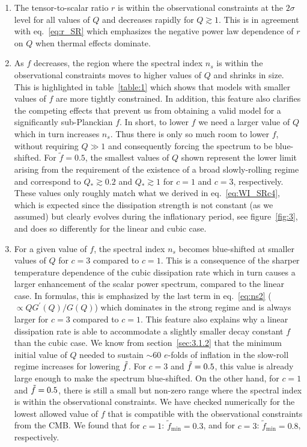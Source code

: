 \documentclass[a4paper,11pt]{article}
\begin{document}
\begin{enumerate}

    \item The tensor-to-scalar ratio $r$ is within the observational constraints at the $2\sigma$ level for all values of $Q$ and decreases rapidly for $Q\gtrsim 1$. This is in agreement with eq.~\eqref{eq:r_SR} which emphasizes the negative power law dependence of $r$ on $Q$ when thermal effects dominate.
    
    \item As $f$ decreases, the region where the spectral index $n_s$ is within the observational constraints moves to higher values of $Q$ and shrinks in size. This is highlighted in table~\ref{table:1} which shows that models with smaller values of $f$ are more tightly constrained. In addition, this feature also clarifies the competing effects that prevent us from obtaining a valid model for a significantly sub-Planckian $f$. In short, to lower $f$ we need a larger value of $Q$ which in turn increases $n_s$. Thus there is only so much room to lower $f$, without requiring $Q \gg 1$ and consequently forcing the spectrum to be blue-shifted. For $\tilde{f}=0.5$, the smallest values of $Q$ shown represent the lower limit arising from the requirement of the existence of a broad slowly-rolling regime and correspond to $Q_{*}\gtrsim 0.2$ and $Q_{*}\gtrsim 1$ for $c=1$ and $c=3$, respectively. These values only roughly match what we derived in eq.~\eqref{eq:WI_SRc4}, which is expected since the dissipation strength is not constant (as we assumed) but clearly evolves during the inflationary period, see figure~\ref{fig:3}, and does so differently for the linear and cubic case.
    
    \item For a given value of $f$, the spectral index $n_s$ becomes blue-shifted at smaller values of $Q$ for $c=3$ compared to $c=1$. This is a consequence of the sharper temperature dependence of the cubic dissipation rate which in turn causes a larger enhancement of the scalar power spectrum, compared to the linear case. In formulas, this is emphasized by the last term in eq.~\eqref{eq:ns2} ($\propto Q G^\prime (Q)/G(Q)$) which dominates in the strong regime and is always larger for $c=3$ compared to $c=1$. This feature also explains why a linear dissipation rate is able to accommodate a slightly smaller decay constant $f$ than the cubic case. We know from section~\ref{sec:3.1.2} that the minimum initial value of $Q$ needed to sustain $\sim 60$ $e$-folds of inflation in the slow-roll regime increases for lowering $\Tilde{f}$. For $c=3$ and $\Tilde{f}=0.5$, this value is already large enough to make the spectrum blue-shifted. On the other hand, for $c=1$ and $\Tilde{f}=0.5$, there is still a small but non-zero range where the spectral index is within the observational constraints. We have checked numerically for the lowest allowed value of $f$ that is compatible with the observational constraints from the CMB. We found that for $c=1$: $\tilde{f}_{\mathrm{min}}=0.3$, and for $c=3$: $\tilde{f}_{\mathrm{min}}=0.8$, respectively.
    

\end{enumerate}
\end{document}
